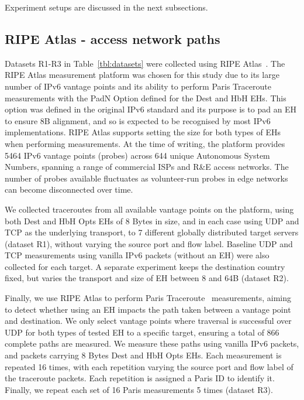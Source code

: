 \documentclass[conference]{IEEEtran}
\begin{document}
Experiment setups are discussed in the next subsections.

    \subsection{RIPE Atlas - access network paths}
    \label{sec:ripe-methodology}

Datasets R1-R3 in Table~\ref{tbl:datasets} were collected using RIPE Atlas~\cite{bajpai2015lessons}.
The RIPE Atlas measurement platform was chosen for this study due to its large number of IPv6 vantage points and its ability to perform Paris Traceroute measurements with the PadN Option defined for the Dest and HbH EHs. This option was defined in the original IPv6 standard and its purpose is to pad an EH to ensure 8B alignment, and so is expected to be recognised by most IPv6 implementations.
RIPE Atlas supports setting the size for both types of EHs when performing measurements. At the time of writing, the platform provides 5464 IPv6 vantage points (probes) across 644 unique Autonomous System Numbers, spanning a range of commercial ISPs and R\&E access networks. The number of probes available fluctuates as volunteer-run probes in edge networks can become disconnected over time.

We collected traceroutes from all available vantage points on the platform, using both Dest and HbH Opts EHs of 8 Bytes in size, and in each case using UDP and TCP as the underlying transport, to 7 different globally distributed target servers (dataset R1), without varying the source port and flow label. Baseline UDP and TCP measurements using vanilla IPv6 packets (without an EH) were also collected for each target.
A separate experiment keeps the destination country fixed, but varies the transport and size of EH between 8 and 64B (dataset R2).

Finally, we use RIPE Atlas to perform Paris Traceroute~\cite{augustin2006avoiding} measurements, aiming to detect whether using an EH impacts the path taken between a vantage point and destination. We only select vantage points where traversal is successful over UDP for both types of tested EH to a specific target, ensuring a total of 866 complete paths are measured.
We measure these paths using vanilla IPv6 packets, and packets carrying 8 Bytes Dest and HbH Opts EHs. Each measurement is repeated 16 times, with each repetition varying the source port and flow label of the traceroute packets. Each repetition is assigned a Paris ID to identify it. Finally, we repeat each set of 16 Paris measurements 5 times (dataset R3).
\end{document}
